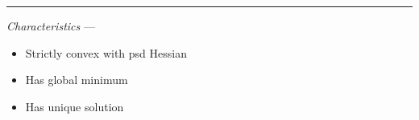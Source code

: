 {\color{lightgray}\hrule height 0.001mm}

\emph{Characteristics} --- 
\begin{itemize}
    \item Strictly convex with psd Hessian
    \item Has global minimum
    \item Has unique solution
\end{itemize}